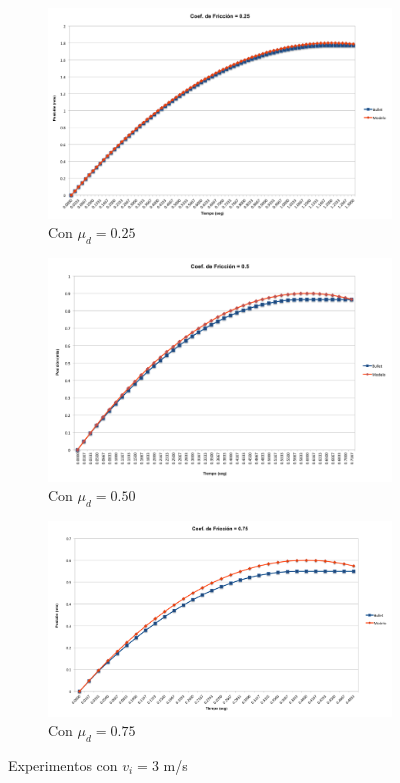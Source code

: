 \documentclass{article}
\begin{document}
\begin{itemize}
\begin{figure}[ht] 
  \begin{subfigure}[b]{0.5\linewidth}
    \centering
    \includegraphics[width=0.75\linewidth]{image009.png} 
    \caption{Con $\mu_d=0.25$} 
    \label{fig2:a} 
    \vspace{4ex}
  \end{subfigure}%
  \begin{subfigure}[b]{0.5\linewidth}
    \centering
    \includegraphics[width=0.75\linewidth]{image007.png} 
    \caption{Con $\mu_d=0.50$} 
    \label{fig2:b} 
    \vspace{4ex}
  \end{subfigure} 
  \begin{subfigure}[b]{\linewidth}
    \centering
    \includegraphics[width=0.4\linewidth]{image008.png} 
    \caption{Con $\mu_d=0.75$} 
    \label{fig2:c} 
  \end{subfigure}%
  \caption{Experimentos con $v_i = 3$ m/s}
  \label{fig2} 
  \vspace*{4ex}
\end{figure}


\end{itemize}
\end{document}
